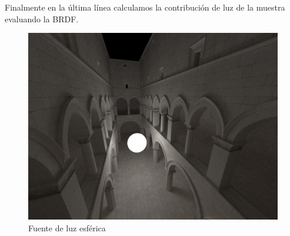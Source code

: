 \medskip

Finalmente en la última línea calculamos la contribución de luz de la muestra evaluando la BRDF.


\begin{figure}
\centering
\includegraphics[width=5in]{esferica.png}
\caption{Fuente de luz esférica}
\end{figure}

